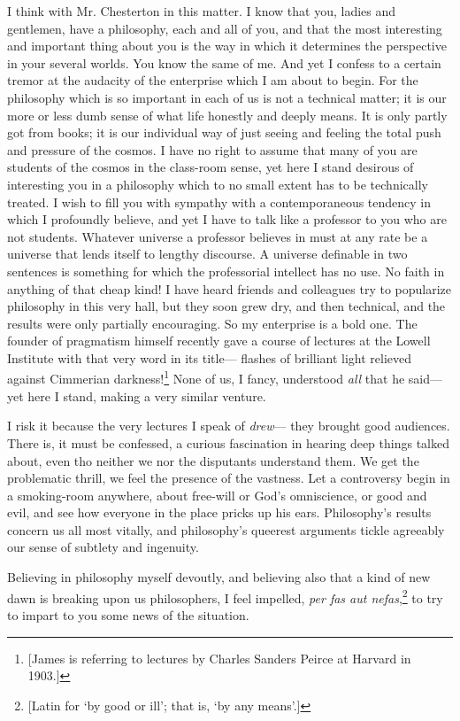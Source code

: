 \documentclass[]{article}
\begin{document}
I think with Mr. Chesterton in this matter. I know that you, ladies and
gentlemen, have a philosophy, each and all of you, and that the most
interesting and important thing about you is the way in which it
determines the perspective in your several worlds. You know the same
of me. And yet I confess to a certain tremor at the audacity of the
enterprise which I am about to begin. For the philosophy which is so
important in each of us is not a technical matter; it is our more or
less dumb sense of what life honestly and deeply means. It is only
partly got from books; it is our individual way of just seeing and
feeling the total push and pressure of the cosmos. I have no right to
assume that many of you are students of the cosmos in the class-room
sense, yet here I stand desirous of interesting you in a philosophy
which to no small extent has to be technically treated. I wish to fill
you with sympathy with a contemporaneous tendency in which I profoundly
believe, and yet I have to talk like a professor to you who are not
students. Whatever universe a professor believes in must at any rate be
a universe that lends itself to lengthy discourse. A universe definable
in two sentences is something for which the professorial intellect has
no use. No faith in anything of that cheap kind! I have heard friends
and colleagues try to popularize philosophy in this very hall, but they
soon grew dry, and then technical, and the results were only partially
encouraging. So my enterprise is a bold one. The founder of pragmatism
himself recently gave a course of lectures at the Lowell Institute with
that very word in its title--- flashes of brilliant light relieved
against Cimmerian darkness!\footnote{[James is referring to lectures by Charles Sanders Peirce at Harvard in 1903.]}
None of us, I fancy, understood \emph{all} that he
said--- yet here I stand, making a very similar venture.

I risk it because the very lectures I speak of \emph{drew}--- they brought good
audiences. There is, it must be confessed, a curious fascination in
hearing deep things talked about, even tho neither we nor the disputants
understand them. We get the problematic thrill, we feel the presence of
the vastness. Let a controversy begin in a smoking-room anywhere, about
free-will or God's omniscience, or good and evil, and see how everyone
in the place pricks up his ears. Philosophy's results concern us all
most vitally, and philosophy's queerest arguments tickle agreeably our
sense of subtlety and ingenuity.

Believing in philosophy myself devoutly, and believing also that a kind
of new dawn is breaking upon us philosophers, I feel impelled, \emph{per fas
aut nefas},\footnote{[Latin for `by good or ill'; that is, `by any means'.]} to try to impart to you some news of the situation.
\end{document}
